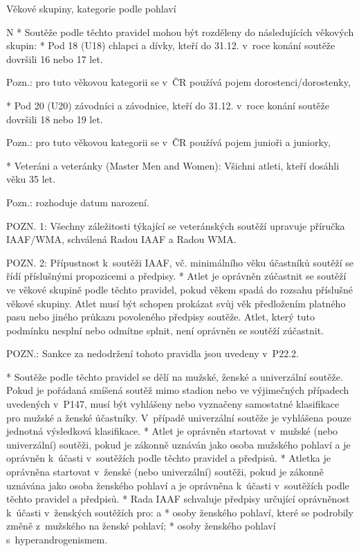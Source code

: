 \secc Věkové skupiny, kategorie podle pohlaví

\begitems \style N
* Soutěže podle těchto pravidel mohou být rozděleny do následujících věkových skupin:
  \begitems
  * Pod 18 (U18) chlapci a dívky, kteří do 31.12. v~roce konání soutěže dovršili 16 nebo 17 let.

  Pozn.: pro tuto věkovou kategorii se v~ČR používá pojem dorostenci/dorostenky,

  * Pod 20 (U20) závodníci a závodnice, kteří do 31.12. v~roce konání soutěže dovršili 18 nebo 19 let.


  Pozn.: pro tuto věkovou kategorii se v~ČR používá pojem junioři a juniorky,

  * Veteráni a veteránky (Master Men and Women): Všichni atleti, kteří dosáhli věku 35 let.

  Pozn.: rozhoduje datum narození.

  POZN. 1: Všechny záležitosti týkající se veteránských soutěží upravuje příručka IAAF/WMA, schválená Radou IAAF a Radou WMA.

  POZN. 2: Přípustnost k~soutěži IAAF, vč. minimálního věku účastníků soutěží se řídí příslušnými propozicemi a předpisy.
  \enditems
* Atlet je oprávněn zúčastnit se soutěží ve věkové skupině podle těchto pravidel, pokud věkem spadá do rozsahu příslušné věkové skupiny. Atlet musí být schopen prokázat svůj věk předložením platného pasu nebo jiného průkazu povoleného předpisy soutěže. Atlet, který tuto podmínku nesplní nebo odmítne splnit, není oprávněn se soutěží zúčastnit.

POZN.: Sankce za nedodržení tohoto pravidla jsou uvedeny v~P22.2.


* Soutěže podle těchto pravidel se dělí na mužské, ženské a univerzální soutěže. Pokud je pořádaná smíšená soutěž mimo stadion nebo ve výjimečných případech uvedených v~P147, musí být vyhlášeny nebo vyznačeny samostatné klasifikace pro mužské a ženské účastníky. V~případě univerzální soutěže je vyhlášena pouze jednotná výsledková klasifikace.
* Atlet je oprávněn startovat v~mužské (nebo univerzální) soutěži, pokud je zákonně uznáván jako osoba mužského pohlaví a je oprávněn k~účasti v~soutěžích podle těchto pravidel a předpisů.
* Atletka je oprávněna startovat v~ženské (nebo univerzální) soutěži, pokud je zákonně uznávána jako osoba ženského pohlaví a je oprávněna k~účasti v~soutěžích podle těchto pravidel a předpisů.
* Rada IAAF schvaluje předpisy určující oprávněnost k~účasti v~ženských soutěžích pro:
  \begitems \style a
  * osoby ženského pohlaví, které se podrobily změně z~mužského na ženské pohlaví;
  * osoby ženského pohlaví s~hyperandrogenismem.
  \enditems

